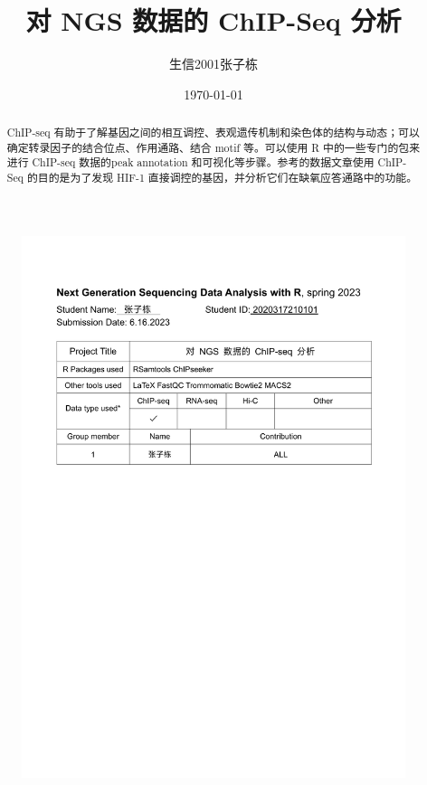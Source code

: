 \documentclass[UTF8]{ctexart}
\title{对 NGS 数据的 ChIP-Seq 分析}
\author{生信2001张子栋}
\date{\today}
\begin{document}
\maketitle
\thispagestyle{empty}

\clearpage

\thispagestyle{empty}
\setcounter{page}{0}

\begin{abstract}
    ChIP-seq 有助于了解基因之间的相互调控、表观遗传机制和染色体的结构与动态；可以确定转录因子的结合位点、作用通路、结合 motif 等。可以使用 R 中的一些专门的包来进行 ChIP-seq 数据的peak annotation 和可视化等步骤。参考的数据文章\cite{ref1}使用 ChIP-Seq 的目的是为了发现 HIF-1 直接调控的基因，并分析它们在缺氧应答通路中的功能。
\end{abstract}

\begin{figure}[!htb]
	\centering
	\includegraphics[width=\textwidth]{img/Final_project_cover.pdf}
\end{figure}
\end{document}
